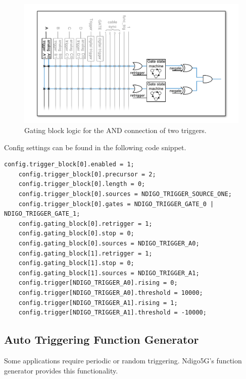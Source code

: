             \begin{figure}[ht]
                \begin{center}
                    \includegraphics[width=\textwidth]{figures/dual-level-triggering_logic.pdf}
                    \caption{\label{fig:dualleveltriglogic}Gating block logic for the AND connection of two triggers.}
                \end{center}
            \end{figure}

            Config settings can be found in the following code snippet.

\begin{lstlisting}[frame=tlrb]
    config.trigger_block[0].enabled = 1;
    config.trigger_block[0].precursor = 2;
    config.trigger_block[0].length = 0;
    config.trigger_block[0].sources = NDIGO_TRIGGER_SOURCE_ONE;
    config.trigger_block[0].gates = NDIGO_TRIGGER_GATE_0 | NDIGO_TRIGGER_GATE_1;
    config.gating_block[0].retrigger = 1;
    config.gating_block[0].stop = 0;
    config.gating_block[0].sources = NDIGO_TRIGGER_A0;
    config.gating_block[1].retrigger = 1;
    config.gating_block[1].stop = 0;
    config.gating_block[1].sources = NDIGO_TRIGGER_A1;
    config.trigger[NDIGO_TRIGGER_A0].rising = 0;
    config.trigger[NDIGO_TRIGGER_A0].threshold = 10000;
    config.trigger[NDIGO_TRIGGER_A1].rising = 1;
    config.trigger[NDIGO_TRIGGER_A1].threshold = -10000;
\end{lstlisting}

    \subsection{Auto Triggering Function Generator\label{cp:AutoTriggeringFunctionGenerator}}

        Some applications require periodic or random triggering. Ndigo5G's function generator provides this functionality.\par

